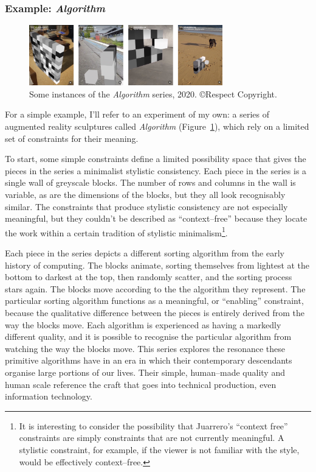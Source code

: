 \documentclass[letterpaper]{article}
\begin{document}
    \subsubsection{Example: \emph{Algorithm}}

    \begin{figure}[h]
        \includegraphics[width=3.31in]{bubble-sort.png}
        \caption{Some instances of the \emph{Algorithm} series, 2020. \copyright Respect Copyright.}
        \label{fig:bubble-sort}
    \end{figure}

    For a simple example, I'll refer to an experiment of my own: a series of augmented reality sculptures called \emph{Algorithm} (Figure~\ref{fig:bubble-sort}), which rely on a limited set of constraints for their meaning.
    
    To start, some simple constraints define a limited possibility space that gives the pieces in the series a minimalist stylistic consistency. Each piece in the series is a single wall of greyscale blocks. The number of rows and columns in the wall is variable, as are the dimensions of the blocks, but they all look recognisably similar. The constraints that produce stylistic consistency are not especially meaningful, but they couldn't be described as “context–free” because they locate the work within a certain tradition of stylistic minimalism\footnote{
        It is interesting to consider the possibility that Juarrero's “context free” constraints are simply constraints that are not currently meaningful. A stylistic constraint, for example, if the viewer is not familiar with the style, would be effectively context–free.
    }.
    
    Each piece in the series depicts a different sorting algorithm from the early history of computing. The blocks animate, sorting themselves from lightest at the bottom to darkest at the top, then randomly scatter, and the sorting process stars again. The blocks move according to the the algorithm they represent. The particular sorting algorithm functions as a meaningful, or “enabling” constraint, because the qualitative difference between the pieces is entirely derived from the way the blocks move. Each algorithm is experienced as having a markedly different quality, and it is possible to recognise the particular algorithm from watching the way the blocks move. This series explores the resonance these primitive algorithms have in an era in which their contemporary descendants organise large portions of our lives. Their simple, human–made quality and human scale reference the craft that goes into technical production, even information technology.
\end{document}
